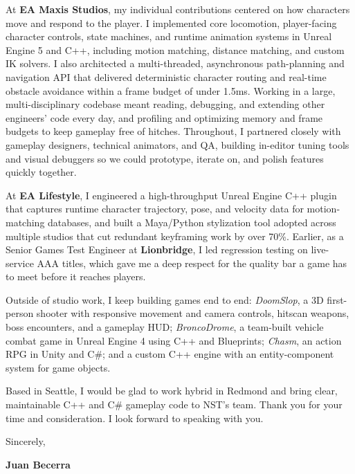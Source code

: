 \documentclass[letterpaper,11pt]{article}
\begin{document}
At \textbf{EA Maxis Studios}, my individual contributions centered on how characters move and respond to the
player. I implemented core locomotion, player-facing character controls, state machines, and runtime animation
systems in Unreal Engine 5 and C++, including motion matching, distance matching, and custom IK solvers. I also
architected a multi-threaded, asynchronous path-planning and navigation API that delivered deterministic
character routing and real-time obstacle avoidance within a frame budget of under 1.5ms. Working in a large,
multi-disciplinary codebase meant reading, debugging, and extending other engineers' code every day, and
profiling and optimizing memory and frame budgets to keep gameplay free of hitches. Throughout, I partnered
closely with gameplay designers, technical animators, and QA, building in-editor tuning tools and visual
debuggers so we could prototype, iterate on, and polish features quickly together.

At \textbf{EA Lifestyle}, I engineered a high-throughput Unreal Engine C++ plugin that captures runtime character
trajectory, pose, and velocity data for motion-matching databases, and built a Maya/Python stylization tool
adopted across multiple studios that cut redundant keyframing work by over 70\%. Earlier, as a Senior Games
Test Engineer at \textbf{Lionbridge}, I led regression testing on live-service AAA titles, which gave me a deep
respect for the quality bar a game has to meet before it reaches players.

Outside of studio work, I keep building games end to end: \emph{DoomSlop}, a 3D first-person shooter with
responsive movement and camera controls, hitscan weapons, boss encounters, and a gameplay HUD;
\emph{BroncoDrome}, a team-built vehicle combat game in Unreal Engine 4 using C++ and Blueprints; \emph{Chasm},
an action RPG in Unity and C\#; and a custom C++ engine with an entity-component system for game objects.

Based in Seattle, I would be glad to work hybrid in Redmond and bring clear, maintainable C++ and C\# gameplay
code to NST's team. Thank you for your time and consideration. I look forward to speaking with you.

\vspace{10pt}
\noindent Sincerely,

\vspace{14pt}
\noindent \textbf{Juan Becerra}
\end{document}
